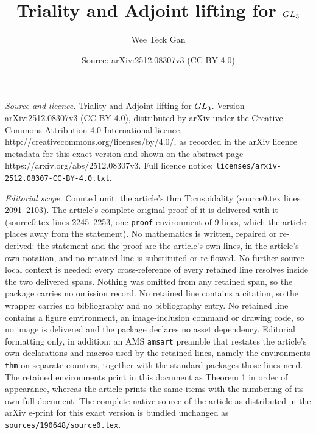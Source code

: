 \documentclass[10pt,a4paper]{amsart}
\title{Triality and Adjoint lifting for $\GL_3$}
\author{Wee Teck Gan}
\date{Source: arXiv:2512.08307v3 (CC BY 4.0)}
\def\GL{{\rm GL}}
\begin{document}
\maketitle

\noindent\emph{Source and licence.} Triality and Adjoint lifting for $\GL_3$. Version arXiv:2512.08307v3 (CC BY 4.0), distributed by arXiv under the Creative Commons Attribution 4.0 International licence, http://creativecommons.org/licenses/by/4.0/, as recorded in the arXiv licence metadata for this exact version and shown on the abstract page https://arxiv.org/abs/2512.08307v3. Full licence notice: \texttt{licenses/arxiv-2512.08307-CC-BY-4.0.txt}.\par\smallskip

\noindent\textit{Editorial scope.} Counted unit: the article's thm T:cuspidality (source0.tex lines 2091--2103). The article's complete original proof of it is delivered with it (source0.tex lines 2245--2253, one \texttt{proof} environment of 9 lines, which the article places away from the statement). No mathematics is written, repaired or re-derived: the statement and the proof are the article's own lines, in the article's own notation, and no retained line is substituted or re-flowed.  No further source-local context is needed: every cross-reference of every retained line resolves inside the two delivered spans.  Nothing was omitted from any retained span, so the package carries no omission record.  No retained line contains a citation, so the wrapper carries no bibliography and no bibliography entry.  No retained line contains a figure environment, an image-inclusion command or drawing code, so no image is delivered and the package declares no asset dependency.  Editorial formatting only, in addition: an AMS \texttt{amsart} preamble that restates the article's own declarations and macros used by the retained lines, namely the environments \texttt{thm} on separate counters, together with the standard packages those lines need.  The retained environments print in this document as Theorem 1 in order of appearance, whereas the article prints the same items with the numbering of its own full document.  The complete native source of the article as distributed in the arXiv e-print for this exact version is bundled unchanged as \texttt{sources/190648/source0.tex}.
\end{document}
